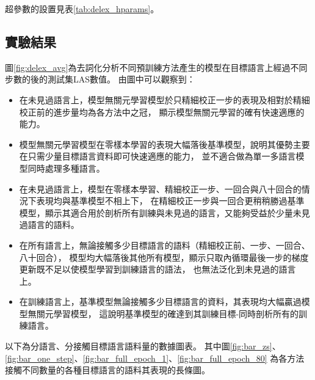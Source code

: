超參數的設置見表\ref{tab:delex_hparams}。
\subsection{實驗結果}


圖\ref{fig:delex_avg}為去詞化分析不同預訓練方法產生的模型在目標語言上經過不同步數的\finetune 後的測試集LAS數值。
由圖中可以觀察到：
\begin{itemize}
    \item 在未見過語言上，模型無關元學習模型於只精細校正一步的表現及相對於精細校正前的進步量均為各方法中之冠，
顯示模型無關元學習的確有快速適應的能力。
    \item 模型無關元學習模型在零樣本學習的表現大幅落後基準模型，說明其優勢主要在只需少量目標語言資料即可快速適應的能力，
    並不適合做為單一多語言模型同時處理多種語言。
    \item 在未見過語言上，\reptile 模型在零樣本學習、精細校正一步、一回合與八十回合的情況下表現均與基準模型不相上下，
在精細校正一步與一回合更稍稍勝過基準模型，顯示其適合用於剖析所有訓練與未見過的語言，又能夠受益於少量未見過語言的語料。
    \item 在所有語言上，無論接觸多少目標語言的語料（精細校正前、一步、一回合、八十回合），
\fomaml 模型均大幅落後其他所有模型，顯示只取內循環最後一步的梯度更新既不足以使模型學習到訓練語言的語法，
也無法泛化到未見過的語言上。
    \item 在訓練語言上，基準模型無論接觸多少目標語言的資料，其表現均大幅贏過模型無關元學習模型，
這說明基準模型的確達到其訓練目標-同時剖析所有的訓練語言。

\end{itemize}

以下為分語言、分接觸目標語言語料量的數據圖表。
其中圖\ref{fig:bar_zs}、\ref{fig:bar_one_step}、\ref{fig:bar_full_epoch_1}、\ref{fig:bar_full_epoch_80}
為各方法接觸不同數量的各種目標語言的語料其表現的長條圖。
\iffalse




\fi




\pagebreak
